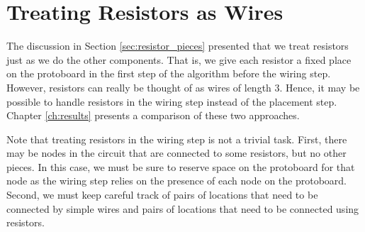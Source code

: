 \section{Treating Resistors as Wires}

The discussion in Section \ref{sec:resistor_pieces} presented that we treat
resistors just as we do the other components. That is, we give each resistor a
fixed place on the protoboard in the first step of the algorithm before the
wiring step. However, resistors can really be thought of as wires of length $3$.
Hence, it may be possible to handle resistors in the wiring step instead of the
placement step. Chapter \ref{ch:results} presents a comparison of these two
approaches.

Note that treating resistors in the wiring step is not a trivial task. First,
there may be nodes in the circuit that are connected to some resistors, but no
other pieces. In this case, we must be sure to reserve space on the protoboard
for that node as the wiring step relies on the presence of each node on the
protoboard. Second, we must keep careful track of pairs of locations that need
to be connected by simple wires and pairs of locations that need to be connected
using resistors.

\label{sec:resistors_as_wires}
